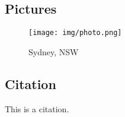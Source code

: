 \documentclass{article}
\begin{document}

\subsection{Pictures}

\begin{figure}[htbp]
    \center
    \texttt{[image: img/photo.png]}
    \caption{Sydney, NSW}
\end{figure}

\subsection{Citation}

This is a citation\cite{Eg}.

\newpage





\end{document}
